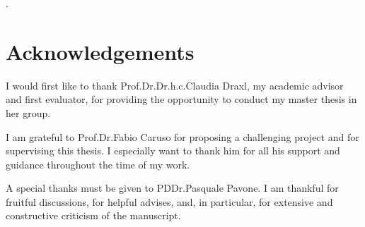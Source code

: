 \phantom.
\vspace{3cm}
\section*{Acknowledgements}
I would first like to thank Prof.\:Dr.\:Dr.\:h.c.\:Claudia Draxl, my academic advisor and first evaluator, for providing the opportunity to conduct my master thesis in her group.\par
 I am grateful to Prof.\:Dr.\:Fabio Caruso for proposing a challenging project and for supervising this thesis. I especially want to thank him for all his support and guidance throughout the time of my work.\par
A special thanks must be given to PD\:Dr.\:Pasquale Pavone. I am thankful for fruitful discussions, for helpful advises, and, in particular, for  extensive and constructive criticism of the manuscript.


